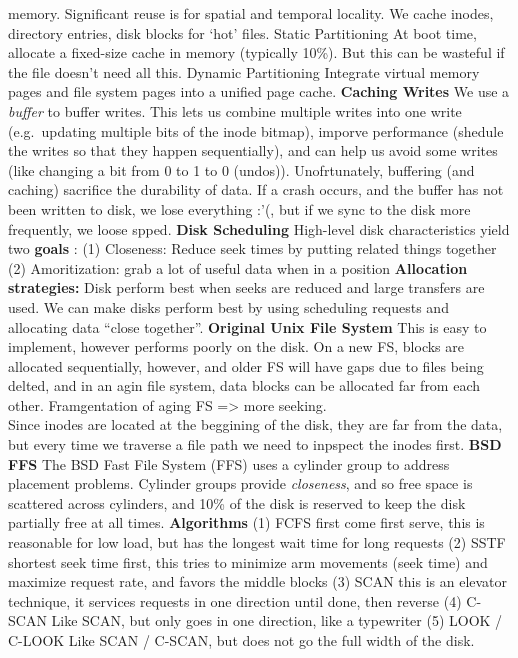 memory. Significant reuse is for spatial and temporal locality.
We cache inodes, directory entries, disk blocks for `hot' files.
Static Partitioning
At boot time, allocate a fixed-size cache in memory (typically 10\%).
But this can be wasteful if the file doesn't need all this.
Dynamic Partitioning
Integrate virtual memory pages and file system pages into a unified page
cache.
{\bf Caching Writes}
We use a \emph{buffer} to buffer writes. This lets us combine multiple
writes into one write (e.g.~updating multiple bits of the inode bitmap),
imporve performance (shedule the writes so that they happen
sequentially), and can help us avoid some writes (like changing a bit
from 0 to 1 to 0 (undos)).
Unofrtunately, buffering (and caching) sacrifice the durability of data.
If a crash occurs, and the buffer has not been written to disk, we lose
everything :'(, but if we sync to the disk more frequently, we loose
spped.
{\bf Disk Scheduling}
High-level disk characteristics yield two {\bf goals }:
(1) Closeness: Reduce seek times by putting related things together
(2) Amoritization: grab a lot of useful data when in a position
{\bf Allocation strategies:}
Disk perform best when seeks are reduced and large transfers are used.
We can make disks perform best by using scheduling requests and
allocating data ``close together''.
{\bf Original Unix File
System}
This is easy to implement, however performs poorly on the disk. On a new
FS, blocks are allocated sequentially, however, and older FS will have
gaps due to files being delted, and in an agin file system, data blocks
can be allocated far from each other. Framgentation of aging FS
=\textgreater{} more seeking.\\
Since inodes are located at the beggining of the disk, they are far from
the data, but every time we traverse a file path we need to inpspect the
inodes first.
{\bf BSD FFS}
The BSD Fast File System (FFS) uses a cylinder group to address
placement problems.
Cylinder groups provide \emph{closeness}, and so free space is scattered
across cylinders, and 10\% of the disk is reserved to keep the disk
partially free at all times.
{\bf Algorithms}
  (1) FCFS
  first come first serve, this is reasonable for low load, but has the
  longest wait time for long requests
  (2)
  SSTF
  shortest seek time first, this tries to minimize arm movements (seek
  time) and maximize request rate, and favors the middle blocks
  (3) SCAN
  this is an elevator technique, it services requests in one direction
  until done, then reverse
  (4) C-SCAN
  Like SCAN, but only goes in one direction, like a typewriter
  (5) LOOK / C-LOOK
  Like SCAN / C-SCAN, but does not go the full width of the disk.

